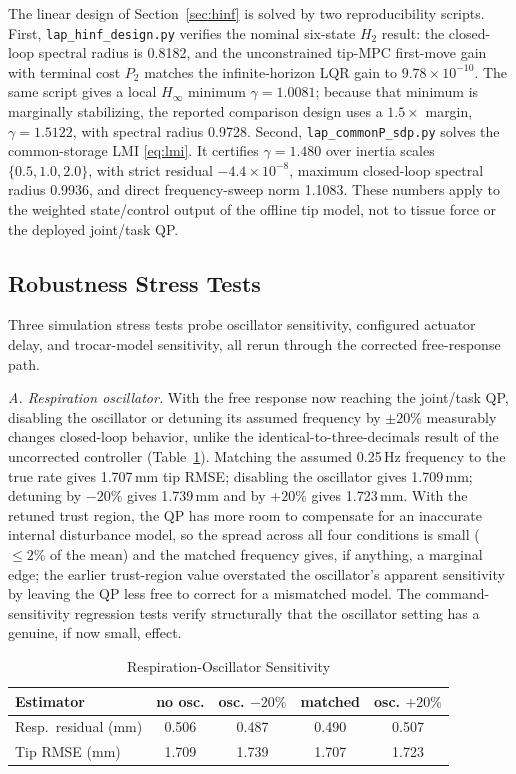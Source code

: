 The linear design of Section~\ref{sec:hinf} is solved by two reproducibility scripts. First, \texttt{lap\_hinf\_design.py} verifies the nominal six-state $H_2$ result: the closed-loop spectral radius is 0.8182, and the unconstrained tip-MPC first-move gain with terminal cost $P_2$ matches the infinite-horizon LQR gain to $9.78\times10^{-10}$. The same script gives a local $H_\infty$ minimum $\gamma=1.0081$; because that minimum is marginally stabilizing, the reported comparison design uses a $1.5\times$ margin, $\gamma=1.5122$, with spectral radius 0.9728. Second, \texttt{lap\_commonP\_sdp.py} solves the common-storage LMI \eqref{eq:lmi}. It certifies $\gamma=1.480$ over inertia scales $\{0.5,1.0,2.0\}$, with strict residual $-4.4\times10^{-8}$, maximum closed-loop spectral radius 0.9936, and direct frequency-sweep norm 1.1083. These numbers apply to the weighted state/control output of the offline tip model, not to tissue force or the deployed joint/task QP.

\subsection{Robustness Stress Tests}\label{sec:robust}

Three simulation stress tests probe oscillator sensitivity, configured actuator delay, and trocar-model sensitivity, all rerun through the corrected free-response path.

\emph{A. Respiration oscillator.} With the free response now reaching the joint/task QP, disabling the oscillator or detuning its assumed frequency by $\pm20\%$ measurably changes closed-loop behavior, unlike the identical-to-three-decimals result of the uncorrected controller (Table~\ref{tab:detune}). Matching the assumed 0.25\,Hz frequency to the true rate gives 1.707\,mm tip RMSE; disabling the oscillator gives 1.709\,mm; detuning by $-20\%$ gives 1.739\,mm and by $+20\%$ gives 1.723\,mm. With the retuned trust region, the QP has more room to compensate for an inaccurate internal disturbance model, so the spread across all four conditions is small (${\le}2\%$ of the mean) and the matched frequency gives, if anything, a marginal edge; the earlier trust-region value overstated the oscillator's apparent sensitivity by leaving the QP less free to correct for a mismatched model. The command-sensitivity regression tests verify structurally that the oscillator setting has a genuine, if now small, effect.

\begin{table}[!t]
\caption{Respiration-Oscillator Sensitivity}
\label{tab:detune}
\centering
\footnotesize
\setlength{\tabcolsep}{3.0pt}
\begin{tabular}{lcccc}
\toprule
Estimator & no osc. & osc. $-20\%$ & matched & osc. $+20\%$ \\
\midrule
Resp.\ residual (mm) & 0.506 & 0.487 & 0.490 & 0.507\\
Tip RMSE (mm) & 1.709 & 1.739 & 1.707 & 1.723\\
\bottomrule
\end{tabular}
\end{table}

